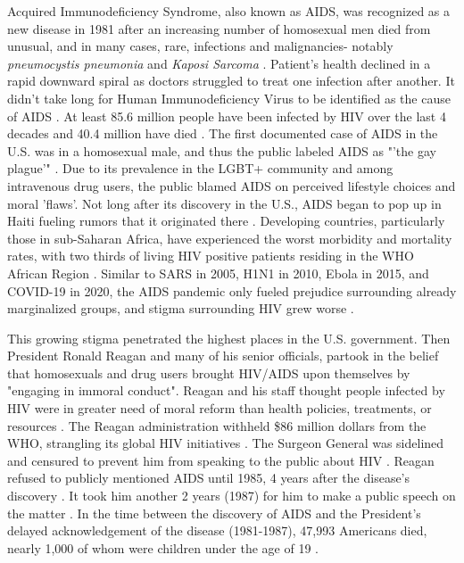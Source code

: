 \documentclass[letterpaper, 11 pt, conference]{ieeeconf}
\begin{document}
Acquired Immunodeficiency Syndrome, also known as AIDS, was recognized as a new disease in 1981 after an increasing number of homosexual men died from unusual, and in many cases, rare, infections and malignancies- notably \emph{pneumocystis pneumonia} and \emph{Kaposi Sarcoma} \cite{OriginsofPandemic, LookBack, Fauci}. Patient's health declined in a rapid downward spiral as doctors struggled to treat one infection after another. It didn't take long for Human Immunodeficiency Virus to be identified as the cause of AIDS \cite{OriginsofPandemic}. At least 85.6 million people have been infected by HIV over the last 4 decades and 40.4 million have died \cite{WHO}. The first documented case of AIDS in the U.S. was in a homosexual male, and thus the public labeled AIDS as "'the gay plague'" \cite{LookBack}. Due to its prevalence in the LGBT+ community and among intravenous drug users, the public blamed AIDS on perceived lifestyle choices and moral 'flaws'. Not long after its discovery in the U.S., AIDS began to pop up in Haiti fueling rumors that it originated there \cite{LookBack}. Developing countries, particularly those in sub-Saharan Africa, have experienced the worst morbidity and mortality rates, with two thirds of living HIV positive patients residing in the WHO African Region \cite{WHO}. Similar to SARS in 2005, H1N1 in 2010, Ebola in 2015, and COVID-19 in 2020, the AIDS pandemic only fueled prejudice surrounding already marginalized groups, and stigma surrounding HIV grew worse \cite{RacialDiscrimination}. 

This growing stigma penetrated the highest places in the U.S. government. Then President Ronald Reagan and many of his senior officials, partook in the belief that homosexuals and drug users brought HIV/AIDS upon themselves by "engaging in immoral conduct". Reagan and his staff thought people infected by HIV were in greater need of moral reform than health policies, treatments, or resources \cite{Koop}. The Reagan administration withheld \$86 million dollars from the WHO, strangling its global HIV initiatives \cite{jhu}. The Surgeon General was sidelined and censured to prevent him from speaking to the public about HIV \cite{Koop}. Reagan refused to publicly mentioned AIDS until 1985, 4 years after the disease's discovery \cite{GSU}. It took him another 2 years (1987) for him to make a public speech on the matter \cite{GSU}. In the time between the discovery of AIDS and the President's delayed acknowledgement of the disease (1981-1987), 47,993 Americans died, nearly 1,000 of whom were children under the age of 19 \cite{CDC}.
\end{document}
